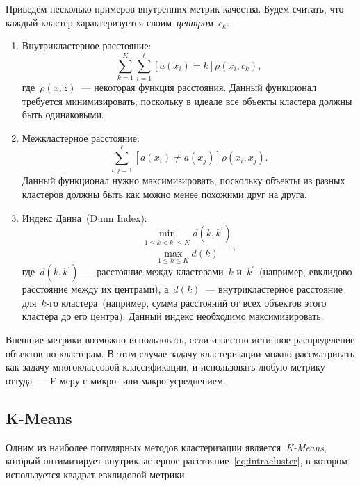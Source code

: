 \documentclass[12pt,fleqn]{article}
\begin{document}
Приведём несколько примеров внутренних метрик качества.
Будем считать, что каждый кластер характеризуется своим~\emph{центром}~$c_k$.
\begin{enumerate}
    \item Внутрикластерное расстояние:
        \begin{equation}
        \label{eq:intracluster}
            \sum_{k = 1}^{K}
            \sum_{i = 1}^{\ell}
                [a(x_i) = k]
                \rho(x_i, c_k),
        \end{equation}
        где~$\rho(x, z)$~--- некоторая функция расстояния.
        Данный функционал требуется минимизировать, поскольку в идеале
        все объекты кластера должны быть одинаковыми.
    \item Межкластерное расстояние:
        \[
            \sum_{i, j = 1}^{\ell}
                [a(x_i) \neq a(x_j)]
                \rho(x_i, x_j).
        \]
        Данный функционал нужно максимизировать, поскольку
        объекты из разных кластеров должны быть как можно менее похожими друг на друга.
    \item Индекс Данна~(Dunn Index):
        \[
            \frac{
                \min_{1 \leq k < k^\prime \leq K}
                    d(k, k^\prime)
            }{
                \max_{1 \leq k \leq K}
                    d(k)
            },
        \]
        где~$d(k, k^\prime)$~--- расстояние между кластерами~$k$ и~$k^\prime$~(например, евклидово расстояние
        между их центрами), а~$d(k)$~--- внутрикластерное расстояние для~$k$-го кластера~(например,
        сумма расстояний от всех объектов этого кластера до его центра).
        Данный индекс необходимо максимизировать.
\end{enumerate}

Внешние метрики возможно использовать, если известно истинное распределение объектов по кластерам.
В этом случае задачу кластеризации можно рассматривать как задачу многоклассовой классификации,
и использовать любую метрику оттуда~--- F-меру с микро- или макро-усреднением.

\subsection{K-Means}
Одним из наиболее популярных методов кластеризации является~\emph{K-Means},
который оптимизирует внутрикластерное расстояние~\eqref{eq:intracluster},
в котором используется квадрат евклидовой метрики.
\end{document}
